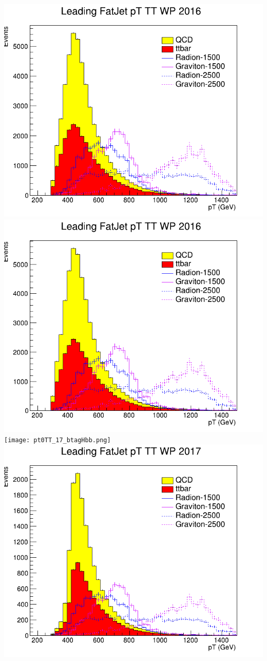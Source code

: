 \includegraphics[width=1\textwidth]{pt0TT_16_btagHbb.png}
\includegraphics[width=1\textwidth]{pt0TT_16_deepTagMD_HbbvsQCD.png}
\texttt{[image: pt0TT\_17\_btagHbb.png]}
\includegraphics[width=1\textwidth]{pt0TT_17_deepTagMD_HbbvsQCD.png}
